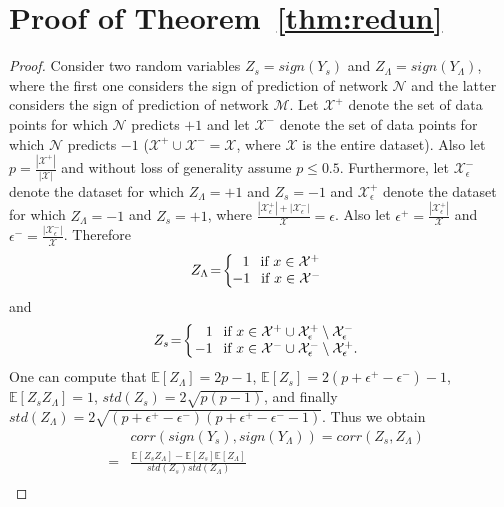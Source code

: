 \documentclass[twoside]{article}
\begin{document}
\section{Proof of Theorem~\ref{thm:redun}}
\begin{proof}
Consider two random variables $Z_s = sign(Y_s)$ and $Z_{\Lambda} = sign(Y_{\Lambda})$, where the first one considers the sign of prediction of network $\mathcal{N}$ and the latter considers the sign of prediction of network $\mathcal{M}$. Let $\mathcal{X}^{+}$ denote the set of data points for which $\mathcal{N}$ predicts $+1$ and let $\mathcal{X}^{-}$ denote the set of data points for which $\mathcal{N}$ predicts $-1$ ($\mathcal{X}^{+} \cup \mathcal{X}^{-} = \mathcal{X}$, where $\mathcal{X}$ is the entire dataset). Also let $p = \frac{|\mathcal{X}^{+}|}{|\mathcal{X}|}$ and without loss of generality assume $p \leq 0.5$. Furthermore, let $\mathcal{X}_{\epsilon}^{-}$ denote the dataset for which $Z_{\Lambda} = +1$ and $Z_s = -1$ and $\mathcal{X}_{\epsilon}^{+}$ denote the dataset for which $Z_{\Lambda} = -1$ and $Z_s = +1$, where $\frac{|\mathcal{X}_{\epsilon}^{+}| + |\mathcal{X}_{\epsilon}^{-}|}{\mathcal{X}} = \epsilon$. Also let $\epsilon^{+} = \frac{|\mathcal{X}_{\epsilon}^{+}|}{\mathcal{X}}$ and $\epsilon^{-} = \frac{|\mathcal{X}_{\epsilon}^{-}|}{\mathcal{X}}$. Therefore
\[Z_{\Lambda} \!=\! \left \{
  \begin{tabular}{c}
  $1$ \:\:if $x \in \mathcal{X}^{+}$\\
  \!\!\!\!$-1$ \:\:if $x \in \mathcal{X}^{-}$
  \end{tabular}
\right.
\]
and
\[Z_s \!=\! \left \{
  \begin{tabular}{c}
  $1$ \:\:if $x \in \mathcal{X}^{+} \cup \mathcal{X}_{\epsilon}^{+}  \setminus \mathcal{X}_{\epsilon}^{-}$\\
  \!\!\!$-1$ \:\:if $x \in \mathcal{X}^{-} \cup \mathcal{X}_{\epsilon}^{-} \setminus \mathcal{X}_{\epsilon}^{+}$.
  \end{tabular}
\right.
\]
One can compute that $\mathbb{E}[Z_{\Lambda}] = 2p-1$, $\mathbb{E}[Z_s] = 2(p + \epsilon^{+} - \epsilon^{-}) - 1$, $\mathbb{E}[Z_sZ_{\Lambda}] = 1$, $std(Z_s) = 2\sqrt{p(p-1)}$, and finally $std(Z_\Lambda) = 2\sqrt{(p + \epsilon^{+} - \epsilon^{-})(p + \epsilon^{+} - \epsilon^{-} - 1)}$.
Thus we obtain
\begin{eqnarray*}
&&corr(sign(Y_s),sign(Y_{\Lambda})) = corr(Z_s,Z_{\Lambda})\\
&=& \frac{\mathbb{E}[Z_sZ_{\Lambda}] - \mathbb{E}[Z_s]\mathbb{E}[Z_{\Lambda}]}{std(Z_s)std(Z_{\Lambda})}\\

\end{eqnarray*}
\end{proof}
\end{document}
